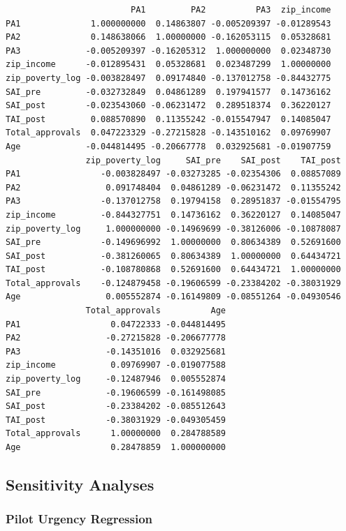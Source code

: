\documentclass[
]{article}
\begin{document}
\begin{verbatim}
                         PA1         PA2          PA3  zip_income
PA1              1.000000000  0.14863807 -0.005209397 -0.01289543
PA2              0.148638066  1.00000000 -0.162053115  0.05328681
PA3             -0.005209397 -0.16205312  1.000000000  0.02348730
zip_income      -0.012895431  0.05328681  0.023487299  1.00000000
zip_poverty_log -0.003828497  0.09174840 -0.137012758 -0.84432775
SAI_pre         -0.032732849  0.04861289  0.197941577  0.14736162
SAI_post        -0.023543060 -0.06231472  0.289518374  0.36220127
TAI_post         0.088570890  0.11355242 -0.015547947  0.14085047
Total_approvals  0.047223329 -0.27215828 -0.143510162  0.09769907
Age             -0.044814495 -0.20667778  0.032925681 -0.01907759
                zip_poverty_log     SAI_pre    SAI_post    TAI_post
PA1                -0.003828497 -0.03273285 -0.02354306  0.08857089
PA2                 0.091748404  0.04861289 -0.06231472  0.11355242
PA3                -0.137012758  0.19794158  0.28951837 -0.01554795
zip_income         -0.844327751  0.14736162  0.36220127  0.14085047
zip_poverty_log     1.000000000 -0.14969699 -0.38126006 -0.10878087
SAI_pre            -0.149696992  1.00000000  0.80634389  0.52691600
SAI_post           -0.381260065  0.80634389  1.00000000  0.64434721
TAI_post           -0.108780868  0.52691600  0.64434721  1.00000000
Total_approvals    -0.124879458 -0.19606599 -0.23384202 -0.38031929
Age                 0.005552874 -0.16149809 -0.08551264 -0.04930546
                Total_approvals          Age
PA1                  0.04722333 -0.044814495
PA2                 -0.27215828 -0.206677778
PA3                 -0.14351016  0.032925681
zip_income           0.09769907 -0.019077588
zip_poverty_log     -0.12487946  0.005552874
SAI_pre             -0.19606599 -0.161498085
SAI_post            -0.23384202 -0.085512643
TAI_post            -0.38031929 -0.049305459
Total_approvals      1.00000000  0.284788589
Age                  0.28478859  1.000000000
\end{verbatim}

\hypertarget{sensitivity-analyses}{%
\subsection{Sensitivity Analyses}\label{sensitivity-analyses}}

\hypertarget{pilot-urgency-regression}{%
\subsubsection{Pilot Urgency
Regression}\label{pilot-urgency-regression}}
\end{document}

